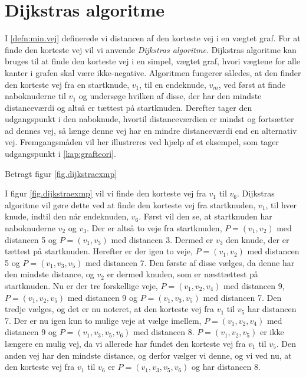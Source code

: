 \section{Dijkstras algoritme} \label{kap:dijkstras}
I \ref{defn:min.vej} definerede vi distancen af den korteste vej i en vægtet graf. For at finde den korteste vej vil vi anvende \emph{Dijkstras algoritme}. Dijkstras algoritme kan bruges til at finde den korteste vej i en simpel, vægtet graf, hvori vægtene for alle kanter i grafen skal være ikke-negative. Algoritmen fungerer således, at den finder den korteste vej fra en startknude, $v_{1}$, til en endeknude, $v_{m}$, ved først at finde naboknuderne til $v_{1}$ og undersøge hvilken af disse, der har den mindste distanceværdi og altså er tættest på startknuden. Derefter tager den udgangspunkt i den naboknude, hvortil distanceværdien er mindst og fortsætter ad dennes vej, så længe denne vej har en mindre distanceværdi end en alternativ vej. Fremgangsmåden vil her illustreres ved hjælp af et eksempel, som tager udgangspunkt i \ref{kap:grafteori}.

\begin{exmp} \label{exmp.dijkstae}
Betragt figur \ref{fig.dijkstraexmp}

I figur \ref{fig.dijkstraexmp} vil vi finde den korteste vej fra $v_{1}$ til $v_{6}$. Dijkstras algoritme vil gøre dette ved at finde den korteste vej fra startknuden, $v_{1}$, til hver knude, indtil den når endeknuden, $v_{6}$. Først vil den se, at startknuden har naboknuderne $v_{2}$ og $v_{3}$. Der er altså to veje fra startknuden, $P=(v_{1},v_{2})$ med distancen 5 og $P=(v_{1},v_{3})$ med distancen 3. Dermed er $v_{3}$ den knude, der er tættest på startknuden. Herefter er der igen to veje, $P=(v_{1},v_{2})$ med distancen 5 og $P=(v_{1},v_{3},v_{5})$ med distancen 7. Den første af disse vælges, da denne har den mindste distance, og $v_{2}$ er dermed knuden, som er næsttættest på startknuden. Nu er der tre forskellige veje, $P=(v_{1},v_{2}, v_{4})$ med distancen 9, $P=(v_{1},v_{2}, v_{5})$ med distancen 9 og $P=(v_{1},v_{3}, v_{5})$ med distancen 7. Den tredje vælges, og det er nu noteret, at den korteste vej fra $v_{1}$ til $v_{5}$ har distancen 7. Der er nu igen kun to mulige veje at vælge imellem, $P=(v_{1},v_{2}, v_{4})$ med distancen 9 og $P=(v_{1},v_{3}, v_{5}, v_{6})$ med distancen 8. $P=(v_{1},v_{2}, v_{5})$ er ikke længere en mulig vej, da vi allerede har fundet den korteste vej fra $v_{1}$ til $v_{5}$. Den anden vej har den mindste distance, og derfor vælger vi denne, og vi ved nu, at den korteste vej fra $v_{1}$ til $v_{6}$ er $P=(v_{1},v_{3}, v_{5}, v_{6})$ og har distancen 8.
\end{exmp}

